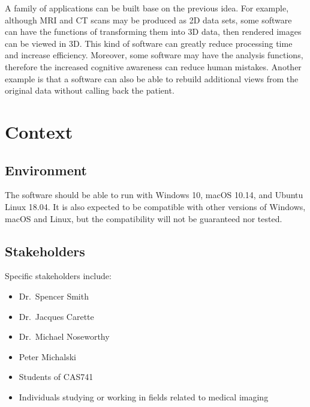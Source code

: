 \documentclass{article}
\begin{document}
\medskip
 A family of applications can be built base on the previous idea. For example, although MRI and CT scans may be produced as 2D data sets, some software can have the functions of transforming them into 3D data, then rendered images can be viewed in 3D. This kind of software can greatly reduce processing time and increase efficiency. Moreover, some software may have the analysis functions, therefore the increased cognitive awareness can reduce human mistakes. Another example is that a software can also be able to rebuild additional views from the original data without calling back the patient.

\section*{Context}
 \subsection*{Environment}
The software should be able to run with Windows 10, macOS 10.14, and Ubuntu Linux 18.04. It is also expected to be compatible with other versions of Windows, macOS and Linux, but the compatibility will not be guaranteed nor tested.

 \subsection*{Stakeholders}
Specific stakeholders include:
\begin{itemize}
\item Dr.\ Spencer Smith
\item Dr.\ Jacques Carette
\item Dr.\ Michael Noseworthy
\item Peter Michalski
\item Students of CAS741 
\item Individuals studying or working in fields related to medical imaging
\end{itemize}
\end{document}
